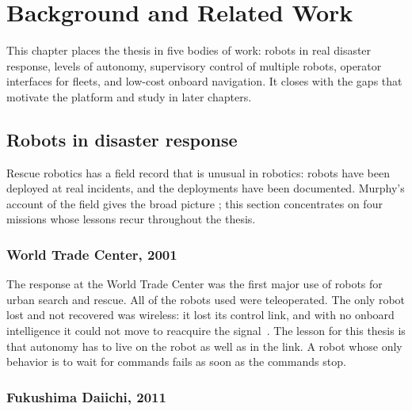 
\chapter{Background and Related Work}
\label{ch:background}

This chapter places the thesis in five bodies of work: robots in real disaster response, levels of autonomy, supervisory control of multiple robots, operator interfaces for fleets, and low-cost onboard navigation.
It closes with the gaps that motivate the platform and study in later chapters.

\section{Robots in disaster response}
\label{sec:bg-disaster}

Rescue robotics has a field record that is unusual in robotics: robots have been deployed at real incidents, and the deployments have been documented.
Murphy's account of the field gives the broad picture \citep{murphy2014disaster}; this section concentrates on four missions whose lessons recur throughout the thesis.

\subsection{World Trade Center, 2001}

The response at the World Trade Center was the first major use of robots for urban search and rescue.
All of the robots used were teleoperated.
The only robot lost and not recovered was wireless: it lost its control link, and with no onboard intelligence it could not move to reacquire the signal~\citep{murphy2004rescue}.
The lesson for this thesis is that autonomy has to live on the robot as well as in the link.
A robot whose only behavior is to wait for commands fails as soon as the commands stop.

\subsection{Fukushima Daiichi, 2011}

